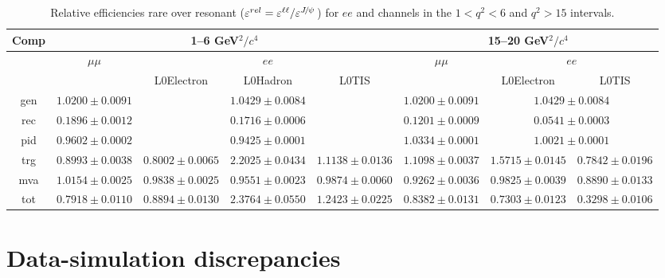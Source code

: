 \begin{landscape}
\begin{table}
\centering
\begin{tabular}{|c|c|c|c|c|c|c|c|}
\hline Comp 			&  \multicolumn{4}{c|}{1--6 GeV$^2/c^4$}  				& \multicolumn {3}{c|}{15--20 GeV$^2/c^4$}  \\ \hline
 			&  $\mu\mu$  				& \multicolumn {3}{c|}{$ee$} 			&  $\mu\mu$  				& \multicolumn {2}{c|}{$ee$} \\ \hline
				&   &  L0Electron 	& L0Hadron 	& L0TIS    &  	& L0Electron 	& L0TIS\\ \hline
gen  & $ 1.0200  \pm  0.0091 $ & \multicolumn{3}{c|}{$ 1.0429  \pm  0.0084 $} & $ 1.0200  \pm  0.0091 $ & \multicolumn{2}{c|}{$ 1.0429  \pm  0.0084 $} \\
rec  & $ 0.1896  \pm  0.0012 $ & \multicolumn{3}{c|}{$ 0.1716  \pm  0.0006 $} & $ 0.1201  \pm  0.0009 $ & \multicolumn{2}{c|}{$ 0.0541  \pm  0.0003 $} \\
pid  & $ 0.9602  \pm  0.0002 $ & \multicolumn{3}{c|}{$ 0.9425  \pm  0.0001 $} & $ 1.0334  \pm  0.0001 $ & \multicolumn{2}{c|}{$ 1.0021  \pm  0.0001 $} \\
\hline
trg  & $ 0.8993  \pm  0.0038 $ & $ 0.8002  \pm  0.0065 $ & $ 2.2025  \pm  0.0434 $ & $ 1.1138  \pm  0.0136 $ & $ 1.1098  \pm  0.0037 $ & $ 1.5715  \pm  0.0145 $ & $ 0.7842  \pm  0.0196 $ \\ 
mva  & $ 1.0154  \pm  0.0025 $ & $ 0.9838  \pm  0.0025 $ & $ 0.9551  \pm  0.0023 $ & $ 0.9874  \pm  0.0060 $ & $ 0.9262  \pm  0.0036 $ & $ 0.9825  \pm  0.0039 $ & $ 0.8890  \pm  0.0133 $ \\ 
tot  & $ 0.7918  \pm  0.0110 $ & $ 0.8894  \pm  0.0130 $ & $ 2.3764  \pm  0.0550 $ & $ 1.2423  \pm  0.0225 $ & $ 0.8382  \pm  0.0131 $ & $ 0.7303  \pm  0.0123 $ & $ 0.3298  \pm  0.0106 $ \\ 
\hline
\end{tabular}
\caption{Relative efficiencies rare over resonant ($\varepsilon^{rel} = \varepsilon^{\ell\ell} / \varepsilon^{\jpsi}$) for $ee$ and \mumu channels in the
$1 < q^2 < 6$ and $q^2 > 15$ \gevgevcccc intervals.}
\label{tab:RKst_releff}
\end{table}

\end{landscape}


\section{Data-simulation discrepancies}
\label{sec:RKst_mc_weighting}

